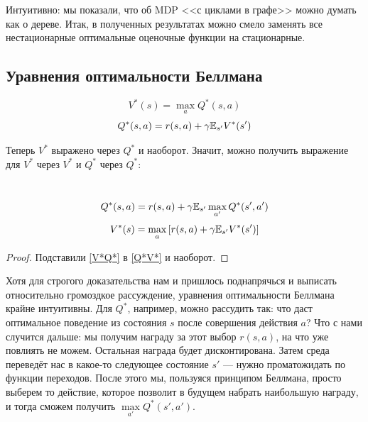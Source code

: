 Интуитивно: мы показали, что об MDP <<с циклами в графе>> можно думать как о дереве. Итак, в полученных результатах можно смело заменять все нестационарные оптимальные оценочные функции на стационарные. 

\subsection{Уравнения оптимальности Беллмана}

\begin{theorem}
\begin{equation}\label{V*Q*}
V^*(s) = \max_a Q^*(s, a)
\end{equation}
\begin{equation}\label{Q*V*}
    Q^*(s, a) = r(s, a) + \gamma \mathbb{E}_{s'} V^*(s')
\end{equation}
\end{theorem}

Теперь $V^*$ выражено через $Q^*$ и наоборот. Значит, можно получить выражение для $V^*$ через $V^*$ и $Q^*$ через $Q^*$:

\begin{theorem}
\,
\begin{equation}\label{Q*Q*}
    Q^*(s, a) =  r(s, a) + \gamma \mathbb{E}_{s'} \max_{a'} Q^*(s', a')
\end{equation}
\begin{equation}\label{V*V*}
    V^*(s) =  \max_a \left[ r(s, a) + \gamma \mathbb{E}_{s'} V^*(s') \right]
\end{equation}
\begin{proof}
Подставили \eqref{V*Q*} в \eqref{Q*V*} и наоборот.
\end{proof}
\end{theorem}

Хотя для строгого доказательства нам и пришлось поднапрячься и выписать относительно громоздкое рассуждение, уравнения оптимальности Беллмана крайне интуитивны. Для $Q^*$, например, можно рассудить так: что даст оптимальное поведение из состояния $s$ после совершения действия $a$? Что с нами случится дальше: мы получим награду за этот выбор $r(s, a)$, на что уже повлиять не можем. Остальная награда будет дисконтирована. Затем среда переведёт нас в какое-то следующее состояние $s'$ --- нужно проматожидать по функции переходов. После этого мы, пользуяся принципом Беллмана, просто выберем то действие, которое позволит в будущем набрать наибольшую награду, и тогда сможем получить $\max\limits_{a'} Q^*(s', a')$. 

